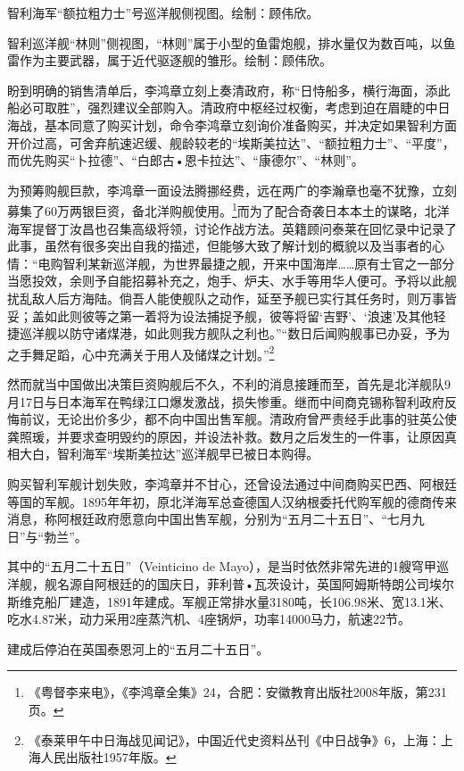 \documentclass[12pt,UTF8]{ctexbook}
\begin{document}
智利海军“额拉粗力士”号巡洋舰侧视图。绘制：顾伟欣。

智利巡洋舰“林则”侧视图，“林则”属于小型的鱼雷炮舰，排水量仅为数百吨，以鱼雷作为主要武器，属于近代驱逐舰的雏形。绘制：顾伟欣。

盼到明确的销售清单后，李鸿章立刻上奏清政府，称“日恃船多，横行海面，添此船必可取胜”，强烈建议全部购入。清政府中枢经过权衡，考虑到迫在眉睫的中日海战，基本同意了购买计划，命令李鸿章立刻询价准备购买，并决定如果智利方面开价过高，可舍弃航速迟缓、舰龄较老的“埃斯美拉达”、“额拉粗力士”、“平度”，而优先购买“卜拉德”、“白郎古•恩卡拉达”、“康德尔”、“林则”。

为预筹购舰巨款，李鸿章一面设法腾挪经费，远在两广的李瀚章也毫不犹豫，立刻募集了60万两银巨资，备北洋购舰使用。\footnote{《粤督李来电》，《李鸿章全集》24，合肥：安徽教育出版社2008年版，第231页。}而为了配合奇袭日本本土的谋略，北洋海军提督丁汝昌也召集高级将领，讨论作战方法。英籍顾问泰莱在回忆录中记录了此事，虽然有很多突出自我的描述，但能够大致了解计划的概貌以及当事者的心情：“电购智利某新巡洋舰，为世界最捷之舰，开来中国海岸……原有士官之一部分当愿投效，余则予自能招募补充之，炮手、炉夫、水手等用华人便可。予将以此舰扰乱敌人后方海陆。倘吾人能使舰队之动作，延至予舰已实行其任务时，则万事皆妥；盖如此则彼等之第一着将为设法捕捉予舰，彼等将留‘吉野’、‘浪速’及其他轻捷巡洋舰以防守诸煤港，如此则我方舰队之利也。”“数日后闻购舰事已办妥，予为之手舞足蹈，心中充满关于用人及储煤之计划。”\footnote{《泰莱甲午中日海战见闻记》，中国近代史资料丛刊《中日战争》6，上海：上海人民出版社1957年版。}

然而就当中国做出决策巨资购舰后不久，不利的消息接踵而至，首先是北洋舰队9月17日与日本海军在鸭绿江口爆发激战，损失惨重。继而中间商克锡称智利政府反悔前议，无论出价多少，都不向中国出售军舰。清政府曾严责经手此事的驻英公使龚照瑗，并要求查明毁约的原因，并设法补救。数月之后发生的一件事，让原因真相大白，智利海军“埃斯美拉达”巡洋舰早已被日本购得。

购买智利军舰计划失败，李鸿章并不甘心，还曾设法通过中间商购买巴西、阿根廷等国的军舰。1895年年初，原北洋海军总查德国人汉纳根委托代购军舰的德商传来消息，称阿根廷政府愿意向中国出售军舰，分别为“五月二十五日”、“七月九日”与“勃兰”。

其中的“五月二十五日”（Veinticino de Mayo），是当时依然非常先进的1艘穹甲巡洋舰，舰名源自阿根廷的的国庆日，菲利普•瓦茨设计，英国阿姆斯特朗公司埃尔斯维克船厂建造，1891年建成。军舰正常排水量3180吨，长106.98米、宽13.1米、吃水4.87米，动力采用2座蒸汽机、4座锅炉，功率14000马力，航速22节。

建成后停泊在英国泰恩河上的“五月二十五日”。
\end{document}
